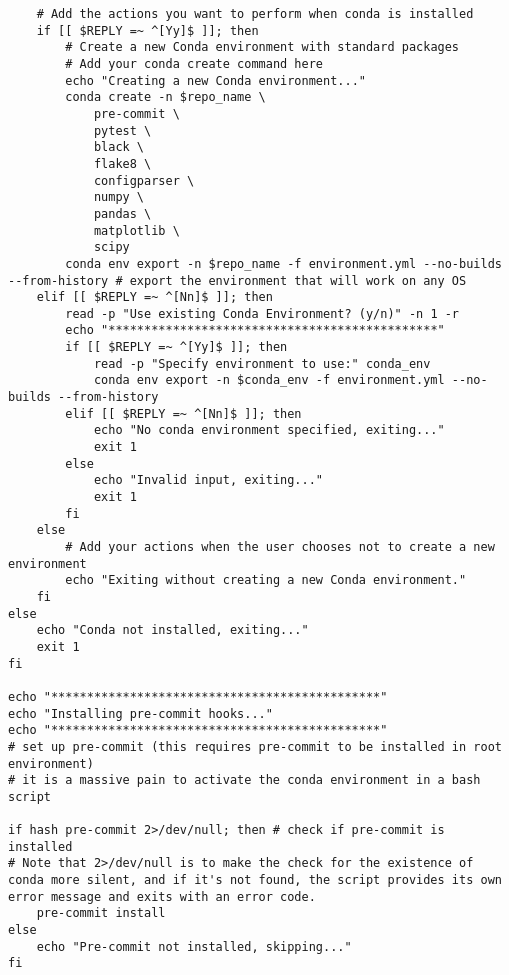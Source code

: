 \documentclass[12pt,a4paper]{article}
\begin{document}
\begin{lstlisting}
    # Add the actions you want to perform when conda is installed
    if [[ $REPLY =~ ^[Yy]$ ]]; then
        # Create a new Conda environment with standard packages
        # Add your conda create command here
        echo "Creating a new Conda environment..."
        conda create -n $repo_name \
            pre-commit \
            pytest \
            black \
            flake8 \
            configparser \
            numpy \
            pandas \
            matplotlib \
            scipy
        conda env export -n $repo_name -f environment.yml --no-builds --from-history # export the environment that will work on any OS
    elif [[ $REPLY =~ ^[Nn]$ ]]; then
        read -p "Use existing Conda Environment? (y/n)" -n 1 -r
        echo "**********************************************"
        if [[ $REPLY =~ ^[Yy]$ ]]; then
            read -p "Specify environment to use:" conda_env
            conda env export -n $conda_env -f environment.yml --no-builds --from-history
        elif [[ $REPLY =~ ^[Nn]$ ]]; then
            echo "No conda environment specified, exiting..."
            exit 1
        else
            echo "Invalid input, exiting..."
            exit 1
        fi
    else
        # Add your actions when the user chooses not to create a new environment
        echo "Exiting without creating a new Conda environment."
    fi
else
    echo "Conda not installed, exiting..."
    exit 1
fi

echo "**********************************************"
echo "Installing pre-commit hooks..."
echo "**********************************************"
# set up pre-commit (this requires pre-commit to be installed in root environment)
# it is a massive pain to activate the conda environment in a bash script

if hash pre-commit 2>/dev/null; then # check if pre-commit is installed
# Note that 2>/dev/null is to make the check for the existence of conda more silent, and if it's not found, the script provides its own error message and exits with an error code.
    pre-commit install
else
    echo "Pre-commit not installed, skipping..."
fi


\end{lstlisting}
\end{document}
